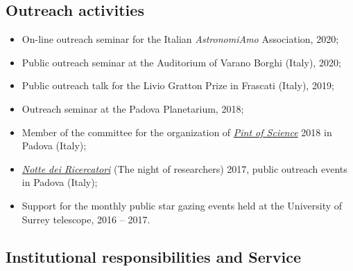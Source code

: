 \subsection*{Outreach activities}

\begin{itemize}
     \item On-line outreach seminar for the Italian \textit{AstronomiAmo} Association, 2020;

    \item Public outreach seminar at the Auditorium of Varano Borghi (Italy), 2020;
    
    \item  Public outreach talk for the Livio Gratton Prize  in Frascati (Italy), 2019;%

    \item Outreach seminar at the Padova Planetarium, 2018;%

    \item Member of the committee for the organization of \href{https://pintofscience.com/}{\it Pint of Science} 2018 in Padova (Italy);
    
    \item \href{http://www.venetonight.it/}{\it Notte dei Ricercatori} (The night of researchers) 2017, public outreach events in Padova  (Italy);
    
    
    \item Support for the monthly public star gazing events held at the University of Surrey telescope, 2016 -- 2017.

\end{itemize}



\subsection*{Institutional responsibilities and Service}

